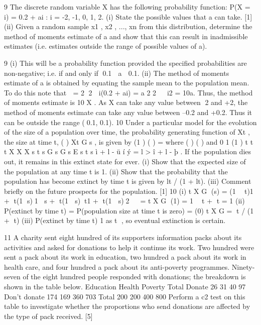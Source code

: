 \documentclass[a4paper,12pt]{article}
\begin{document}
9 The discrete random variable X has the following probability function:
P(X = i) = 0.2 + ai : i = -2, -1, 0, 1, 2.
(i) State the possible values that a can take. [1]
(ii) Given a random sample x1 , x2 , ..., xn from this distribution, determine
the method of moments estimate of a and show that this can result in
inadmissible estimates (i.e. estimates outside the range of possible
values of a). 

9 (i) This will be a probability function provided the specified probabilities are
non-negative; i.e. if and only if 0.1  a  0.1.
(ii) The method of moments estimate of a is obtained by equating the sample
mean to the population mean. To do this note that
 = 2
2
 i(0.2 + ai) = a 2
2 
 i2 = 10a.
Thus, the method of moments estimate is 10
X .
As X can take any value between 2 and +2, the method of moments
estimate can take any value between –0.2 and +0.2. Thus it can be
outside the range (0.1, 0.1).
10 Under a particular model for the evolution of the size of a population over
time, the probability generating function of Xt , the size at time t, ( )
Xt G s , is
given by
(1 )
( ) = where ( ) ( ) and 0
1 (1 )
t
t t
X
X X
s t s
G s G s E s
t s
ì + l - ü
í ý = l >
î + l - þ
.
If the population dies out, it remains in this extinct state for ever.
(i) Show that the expected size of the population at any time t is 1. 
(ii) Show that the probability that the population has become extinct by
time t is given by lt / (1 + lt). 
(iii) Comment briefly on the future prospects for the population. [1]
10 (i)
t
X G (s) = (1  t){1 + t(1  s)}1 {s + t(1  s)}{t}{1 + t(1  s)}2
  =
t
X G (1) = 1  t + t = 1
(ii) P(extinct by time t) = P(population size at time t is zero)
= (0)
t
X G = t / (1 + t)
(iii) P(extinct by time t) 
 1 as t 
 , so eventual extinction is certain.

\newpage
11 A charity sent eight hundred of its supporters information packs about its
activities and asked for donations to help it continue its work. Two hundred
were sent a pack about its work in education, two hundred a pack about its
work in health care, and four hundred a pack about its anti-poverty
programmes. Ninety-seven of the eight hundred people responded with
donations; the breakdown is shown in the table below.
Education Health Poverty Total
Donate 26 31 40 97
Don’t donate 174 169 360 703
Total 200 200 400 800
Perform a c2 test on this table to investigate whether the proportions who
send donations are affected by the type of pack received. [5]
\end{document}
